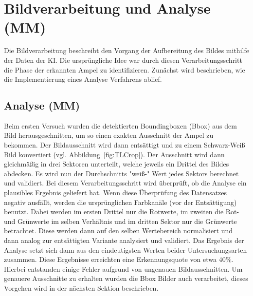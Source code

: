 \documentclass[a4paper,oneside,12pt]{report}
\begin{document}
	\chapter{Bildverarbeitung und Analyse (MM)}
	\begin{onehalfspace}
		Die Bildverarbeitung beschreibt den Vorgang der Aufbereitung des Bildes mithilfe der Daten der KI. Die ursprüngliche Idee war durch diesen Verarbeitungsschritt die Phase der erkannten Ampel zu identifizieren. Zunächst wird beschrieben, wie die Implementierung eines Analyse Verfahrens ablief. 
		\section{Analyse (MM)}
		Beim ersten Versuch wurden die detektierten Boundingboxen (Bbox) aus dem Bild herausgeschnitten, um so einen exakten Ausschnitt der Ampel zu bekommen. Der Bildausschnitt wird dann entsättigt und zu einem Schwarz-Weiß Bild konvertiert (vgl. Abbildung~\ref{fig:TLCrop}). Der Ausschnitt wird dann gleichmäßig in drei Sektoren unterteilt, welche jeweils ein Drittel des Bildes abdecken. Es wird nun der Durchschnitts "weiß-" Wert jedes Sektors berechnet und validiert. Bei diesem Verarbeitungsschritt wird überprüft, ob die Analyse ein plausibles Ergebnis geliefert hat. Wenn diese Überprüfung des Datensatzes negativ ausfällt, werden die ursprünglichen Farbkanäle (vor der Entsättigung) benutzt. Dabei werden im ersten Drittel nur die Rotwerte, im zweiten die Rot- und Grünwerte im selben Verhältnis und im dritten Sektor nur die Grünwerte betrachtet. Diese werden dann auf den selben Wertebereich normalisiert und dann analog zur entsättigten Variante analysiert und validiert. Das Ergebnis der Analyse setzt sich dann aus den eindeutigsten Werten beider Untersuchungsarten zusammen. \newline
		Diese Ergebnisse erreichten eine Erkennungsquote von etwa 40\%. Hierbei entstanden einige Fehler aufgrund von ungenauen Bildausschnitten. Um genauere Ausschnitte zu erhalten wurden die Bbox Bilder auch verarbeitet, dieses Vorgehen wird in der nächsten Sektion beschrieben.

\end{onehalfspace}
\end{document}
